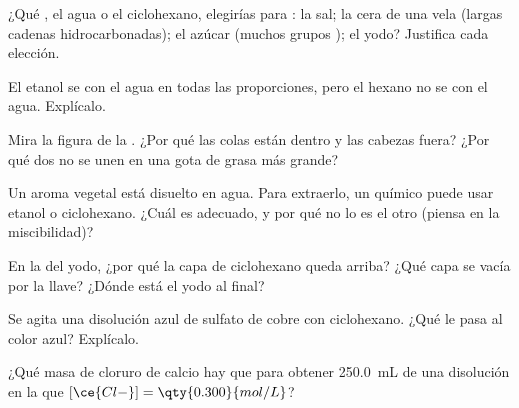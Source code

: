 \begin{exercise}[$\star\star$]\label{exo:g11:dissolution:6}
¿Qué , el agua o el ciclohexano, elegirías para : la
sal; la cera de una vela (largas cadenas hidrocarbonadas); el azúcar
(muchos grupos ); el yodo? Justifica cada elección.
\end{exercise}

\begin{exercise}[$\star\star$]\label{exo:g11:dissolution:7}
El etanol  se  con el agua en todas las
proporciones, pero el hexano  no se  con el agua.
Explícalo.
\end{exercise}

\begin{exercise}[$\star\star$]\label{exo:g11:dissolution:8}
Mira la figura de la . ¿Por qué las colas están dentro y las
cabezas fuera? ¿Por qué dos  no se unen en una gota de grasa más
grande?
\end{exercise}

\begin{exercise}[$\star\star$]\label{exo:g11:dissolution:9}
Un aroma vegetal está disuelto en agua. Para extraerlo, un químico
puede usar etanol o ciclohexano. ¿Cuál es adecuado, y por qué no lo es
el otro (piensa en la miscibilidad)?
\end{exercise}

\begin{exercise}[$\star\star$]\label{exo:g11:dissolution:10}
En la  del yodo, ¿por qué la capa de ciclohexano queda arriba?
¿Qué capa se vacía por la llave? ¿Dónde está el yodo al final?
\end{exercise}

\begin{exercise}[$\star\star$]\label{exo:g11:dissolution:11}
Se agita una disolución azul de sulfato de cobre con ciclohexano. ¿Qué
le pasa al color azul? Explícalo.
\end{exercise}

\begin{exercise}[$\star\star\star$]\label{exo:g11:dissolution:12}
¿Qué masa de cloruro de calcio hay que  para obtener
\qty{250.0}{mL} de una disolución en la que
$[\ce{Cl-}] = \qty{0.300}{mol/L}$?
\end{exercise}

